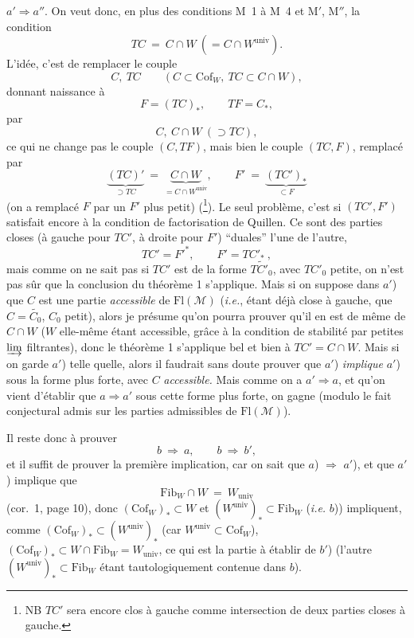\documentclass[11pt]{article}
\newcommand{\printedpage}[1]{\marginpar{\footnotesize p.~#1}}
\newcommand{\msp}[1]{\marginpar{\footnotesize [#1]}}
\newcommand{\Fl}{\mathrm{Fl}}
\newcommand{\Cof}{\mathrm{Cof}}
\newcommand{\Fib}{\mathrm{Fib}}
\newcommand{\univ}{\mathrm{univ}}
\begin{document}
$a' \Longrightarrow a''$. On veut donc, en plus des conditions M~1 à M~4 et M$'$, M$''$, la condition
\[ TC \ =\ C \cap W\ (= C \cap W^{\univ}). \]
L'idée, c'est de remplacer le couple
\msp{page 18}
\[ C,\ TC \qquad (C \subset \Cof_W,\ TC \subset C \cap W), \]
donnant naissance à
\[ F = (TC)_*, \qquad TF = C_*, \]
par
\[ C,\ C \cap W\ (\supset TC), \]
\printedpage{11}
ce qui ne change pas le couple $(C, TF)$, mais bien le couple $(TC, F)$, remplacé par
\[ \underbrace{(TC)'}_{\supset TC} \ =\ \underbrace{C \cap W}_{= C\cap W^{\univ}}, \qquad F' \ =\ \underbrace{(TC')_*}_{\subset F} \]
(on a remplacé $F$ par un $F'$ plus petit) (\footnote[14]{NB $TC'$ sera encore clos à gauche comme intersection de deux parties closes à gauche.}). Le seul problème, c'est si $(TC', F')$ satisfait encore à la condition de factorisation de Quillen. Ce sont des parties closes (à gauche pour $TC'$, à droite pour $F'$) “duales” l'une de l'autre,
\[ TC' = F'^*, \qquad F' = TC'_* \ , \]
mais comme on ne sait pas si $TC'$ est de la forme $\widetilde{TC'_0}$, avec $TC'_0$ petite, on n'est pas sûr que la conclusion du théorème 1 s'applique. Mais si on suppose dans $a'$) que $C$ est une partie \textit{accessible} de $\Fl(\mathcal{M})$ (\textit{i.e.}, étant déjà close à gauche, que $C = \widetilde{C_0}$, $C_0$ petit),
\msp{page 19}
alors je présume qu'on pourra prouver qu'il en est de même de $C \cap W$ ($W$ elle-même étant accessible, grâce à la condition de stabilité par petites $\varinjlim$ filtrantes), donc le théorème 1 s'applique bel et bien à $TC' = C \cap W$. Mais si on garde $a'$) telle quelle, alors il faudrait sans doute prouver que $a'$) \textit{implique} $a'$) sous la forme plus forte, avec $C$ \textit{accessible.} Mais comme on a $a' \Longrightarrow a$, et qu'on vient d'établir que $a \Longrightarrow a'$ sous cette forme plus forte, on gagne (modulo le fait conjectural admis sur les parties admissibles de $\Fl(\mathcal{M})$).

Il reste donc à prouver
\[ b \ \Longrightarrow\ a, \qquad b \ \Longrightarrow\ b', \]
et il suffit de prouver la première implication, car on sait que $a$) $\Longrightarrow$ $a'$), et que $a'$) implique que
\[ \Fib_W \cap W \ =\ W_{\univ} \]
(cor.~1, page 10), donc $(\Cof_W)_* \subset W$ et $(W^{\univ})_* \subset \Fib_W$ (\textit{i.e.} $b$)) impliquent, comme $(\Cof_W)_* \subset (W^{\univ})_*$ (car $W^{\univ} \subset \Cof_W$), $(\Cof_W)_* \subset W \cap \Fib_W = W_{\univ}$, ce qui est la partie à établir de $b'$) (l'autre $(W^{\univ})_* \subset \Fib_W$ étant tautologiquement contenue dans $b$).
\end{document}
